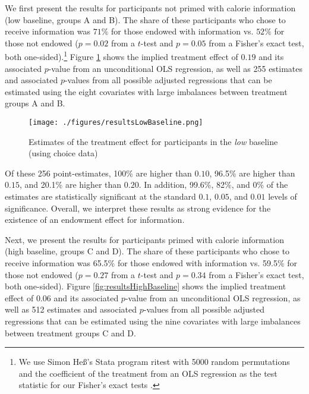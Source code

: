We first present the results for participants not primed with calorie information (low baseline, groups A and B). The share of these participants who chose to receive information was $71\%$ for those endowed with information vs. $52\%$ for those not endowed ($p=0.02$ from a $t$-test and $p=0.05$ from a Fisher’s exact test,  both one-sided).\footnote{We use Simon Heß’s Stata program ritest \citep{hessRandomizationInferenceStata2017} with 5000 random permutations and the coefficient of the treatment from an OLS regression as the test statistic for our Fisher’s exact tests \citet{imbensCausalInferenceStatistics2015}.} Figure \ref{fig:resultsLowBaseline} shows the implied treatment effect of $0.19$ and its associated $p$-value from an unconditional OLS regression, as well as 255 estimates and associated $p$-values from all possible adjusted regressions that can be estimated using the eight covariates with large imbalances between treatment groups A and B.

\begin{figure}[ht]
  \caption{Estimates of the treatment effect for participants in the \emph{low} baseline \\ (using choice data)}\label{fig:resultsLowBaseline}
  \begin{center}
  {\texttt{[image: ./figures/resultsLowBaseline.png]}}
  \end{center}
\end{figure}

Of these 256 point-estimates, 100\% are higher than $0.10$, 96.5\% are higher than $0.15$, and 20.1\% are higher than $0.20$. In addition, 99.6\%, 82\%, and 0\% of the estimates are statistically significant at the standard $0.1$, $0.05$, and $0.01$ levels of significance. Overall, we interpret these results as strong evidence for the existence of an endowment effect for information.

Next, we present the results for participants primed with calorie information (high baseline, groups C and D). The share of these participants who chose to receive information was 65.5\% for those endowed with information vs. 59.5\% for those not endowed ($p=0.27$ from a $t$-test and $p=0.34$ from a Fisher’s exact test, both one-sided). Figure \ref{fig:resultsHighBaseline} shows the implied treatment effect of $0.06$ and its associated $p$-value from an unconditional OLS regression, as well as 512 estimates and associated $p$-values from all possible adjusted regressions that can be estimated using the nine covariates with large imbalances between treatment groups C and D.

